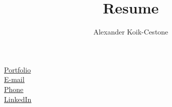 \documentclass{article}
\author{Alexander Koik-Cestone}
\title{Resume}
\begin{document}
\maketitle
\begin{center}
\href{https://sirkoik.github.io#portfolio}{\underline{Portfolio}} \\
\href{mailto:akoikcestone@gmail.com}{\underline{E-mail}} \\
\href{tel:614-674-0668}{\underline{Phone}} \\
\href{https://www.linkedin.com/in/alexander-koik-cestone-89304556/}{\underline{LinkedIn}}
\end{center}
\end{document}
